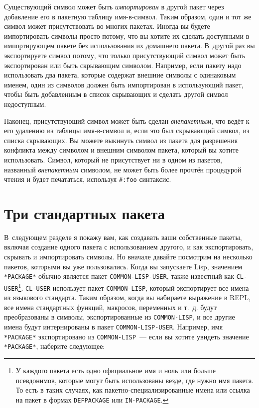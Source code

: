 Существующий символ может быть \textit{импортирован} в другой пакет через добавление его в
пакетную таблицу имя-в-символ.  Таким образом, один и тот же символ может присутствовать
во многих пакетах. Иногда вы будете импортировать символы просто потому, что вы хотите их
сделать доступными в импортирующем пакете без использования их домашнего пакета. В~другой
раз вы экспортируете символ потому, что только присутствующий символ может быть
экспортирован или быть скрывающим символом. Например, если пакету надо использовать два
пакета, которые содержат внешние символы с одинаковым именем, один из символов должен быть
импортирован в ис\-поль\-зую\-щий пакет, чтобы быть добавленным в список скрывающих и сделать
другой символ недоступным.

Наконец, присутствующий символ может быть сделан \textit{внепакетным}, что ведёт к его
удалению из таблицы имя-в-символ и, если это был скрывающий символ, из списка скрывающих.
Вы можете выкинуть символ из пакета для разрешения конфликта между символом и внешним
символом пакета, который вы хотите использовать. Символ, который не присутствует ни в
одном из пакетов, названный \textit{внепакетным} символом, не может быть более прочтён
процедурой чтения и будет печататься, используя \lstinline!#:foo! синтаксис.

\section{Три стандартных пакета}
 
В~следующем разделе я покажу вам, как создавать ваши собственные пакеты, включая создание
одного пакета с использованием другого, и как экспортировать, скрывать и импортировать
символы. Но вначале давайте посмотрим на несколько пакетов, которыми вы уже
пользовались. Когда вы запускаете Lisp, значением \lstinline{*PACKAGE*} обычно является пакет
\lstinline{COMMON-LISP-USER}, также известный как \lstinline{CL-USER}\footnote{У каждого пакета
  есть одно официальное имя и ноль или больше псевдонимов, которые могут быть использованы
  везде, где нужно имя пакета. То есть в таких случаях, как пакетно-специализированные
  имена или ссылка на пакет в формах \lstinline{DEFPACKAGE} или \lstinline{IN-PACKAGE}.}\hspace{\footnotenegspace}.
\lstinline{CL-USER} использует пакет \lstinline{COMMON-LISP}, который экспортирует все имена из
языкового стандарта. Таким образом, когда вы набираете выражение в REPL, все имена
стандартных функций, макросов, переменных и т.~д. будут преобразованы в символы,
экспортированные из \lstinline{COMMON-LISP}, и все другие имена будут интернированы в пакет
\lstinline{COMMON-LISP-USER}. Например, имя \lstinline{*PACKAGE*} экспортировано из
\lstinline{COMMON-LISP}~--- если вы хотите увидеть значение \lstinline{*PACKAGE*}, наберите
следующее:

